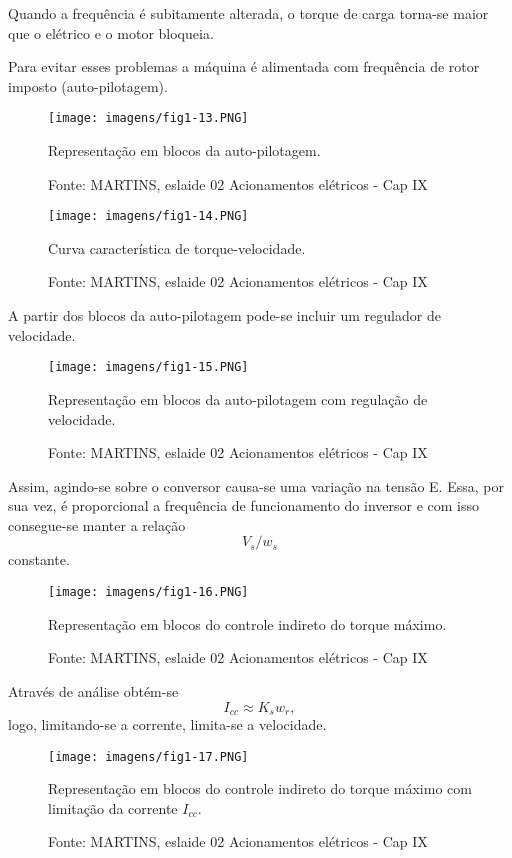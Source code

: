 Quando a frequência é subitamente alterada, o torque de carga torna-se maior que o elétrico e o motor bloqueia.

Para evitar esses problemas a máquina é alimentada com frequência de rotor imposto (auto-pilotagem).

\begin{figure}[ht!]
\center
\texttt{[image: imagens/fig1-13.PNG]}
\caption{\label{fig:fig1-13}Representação em blocos da auto-pilotagem.}
\caption*{Fonte: MARTINS, eslaide 02 Acionamentos elétricos - Cap IX}
\end{figure}

\begin{figure}[ht!]
\center
\texttt{[image: imagens/fig1-14.PNG]}
\caption{\label{fig:fig1-14}Curva característica de torque-velocidade.}
\caption*{Fonte: MARTINS, eslaide 02 Acionamentos elétricos - Cap IX}
\end{figure}

A partir dos blocos da auto-pilotagem pode-se incluir um regulador de velocidade.

\begin{figure}[ht!]
\center
\texttt{[image: imagens/fig1-15.PNG]}
\caption{\label{fig:fig1-15}Representação em blocos da auto-pilotagem com regulação de velocidade.}
\caption*{Fonte: MARTINS, eslaide 02 Acionamentos elétricos - Cap IX}
\end{figure}

Assim, agindo-se sobre o conversor causa-se uma variação na tensão E. Essa, por sua vez, é proporcional a frequência de funcionamento do inversor e com isso consegue-se manter a relação \[V_{s}/w_{s}\] constante.

\begin{figure}[ht!]
\center
\texttt{[image: imagens/fig1-16.PNG]}
\caption{\label{fig:fig1-16}Representação em blocos do controle indireto do torque máximo.}
\caption*{Fonte: MARTINS, eslaide 02 Acionamentos elétricos - Cap IX}
\end{figure}

Através de análise obtém-se
\[I_{cc} \approx K_{s}w_{r},\]
logo, limitando-se a corrente, limita-se a velocidade.

\begin{figure}[ht!]
\center
\texttt{[image: imagens/fig1-17.PNG]}
\caption{\label{fig:fig1-17}Representação em blocos do controle indireto do torque máximo com limitação da corrente $I_{cc}$.}
\caption*{Fonte: MARTINS, eslaide 02 Acionamentos elétricos - Cap IX}
\end{figure}

